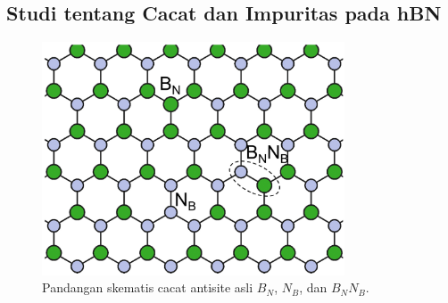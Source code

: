 \subsection{Studi tentang Cacat dan Impuritas pada hBN}

\begin{figure}[htbp]
  \centering
  \includegraphics[width=0.8\textwidth]{gambar/antisite_hBN.jpg}
  \caption{Pandangan skematis cacat antisite asli $B_N$, $N_B$, dan $B_NN_B$. \citep{song2025}}
  \label{fig:schematic_antisite_defects}
\end{figure}

